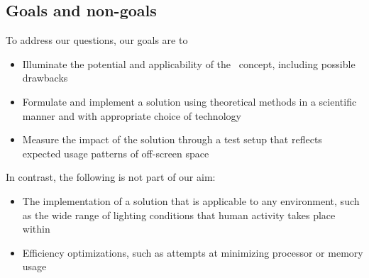\subsection{Goals and non-goals}

To address our questions, our goals are to 

\begin{itemize}
	\item Illuminate the potential and applicability of the \AirSwipe\ concept, including possible drawbacks
	\item Formulate and implement a solution using theoretical methods in a scientific manner and with appropriate choice of technology
	\item Measure the impact of the solution through a test setup that reflects expected usage patterns of off-screen space
\end{itemize}
\noi
In contrast, the following is not part of our aim:

\begin{itemize}
	\item The implementation of a solution that is applicable to any environment, such as the wide range of lighting conditions that  human activity takes place within
	\item Efficiency optimizations, such as attempts at minimizing processor  or memory usage 
\end{itemize}


%
%
%
%	



